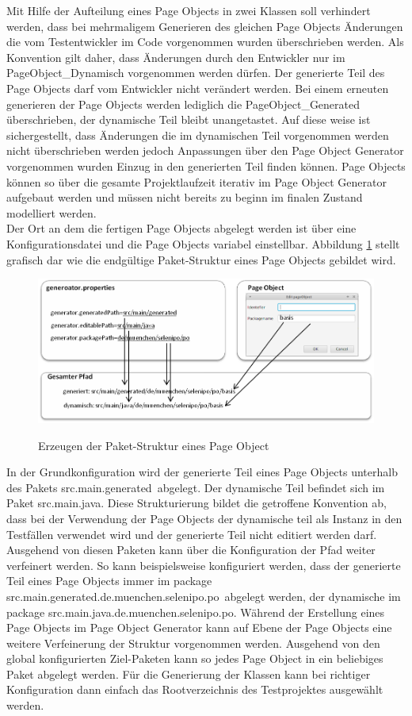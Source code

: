 Mit Hilfe der Aufteilung eines Page Objects in zwei Klassen soll verhindert werden, dass bei mehrmaligem Generieren des gleichen Page Objects Änderungen die vom Testentwickler im Code vorgenommen wurden überschrieben werden. Als Konvention gilt daher, dass Änderungen durch den Entwickler nur im PageObject\_Dynamisch vorgenommen werden dürfen. Der generierte Teil des Page Objects darf vom Entwickler nicht verändert werden.
Bei einem erneuten generieren der Page Objects werden lediglich die PageObject\_Generated überschrieben, der dynamische Teil bleibt unangetastet.
Auf diese weise ist sichergestellt, dass Änderungen die im dynamischen Teil vorgenommen werden nicht überschrieben werden jedoch Anpassungen über den Page Object Generator vorgenommen wurden Einzug in den generierten Teil finden können.
Page Objects können so über die gesamte Projektlaufzeit iterativ im Page Object Generator aufgebaut werden und müssen nicht bereits zu beginn im finalen Zustand modelliert werden.\\
Der Ort an dem die fertigen Page Objects abgelegt werden ist über eine Konfigurationsdatei und die Page Objects variabel einstellbar. 
Abbildung \ref{fig:packagepath} stellt grafisch dar wie die endgültige Paket-Struktur eines Page Objects gebildet wird.
\begin{figure}[htb]
  \centering  
  \includegraphics[scale=0.8]{img/packagePath.png}\\
  \caption{Erzeugen der Paket-Struktur eines Page Object}
  \label{fig:packagepath}
\end{figure}
In der Grundkonfiguration wird der generierte Teil eines Page Objects unterhalb des Pakets \grq src.main.generated\grq\ abgelegt. Der dynamische Teil befindet sich im Paket \grq src.main.java\grq.
Diese Strukturierung bildet die getroffene Konvention ab, dass bei der Verwendung der Page Objects der dynamische teil als Instanz in den Testfällen verwendet wird und der generierte Teil nicht editiert werden darf.
Ausgehend von diesen Paketen kann über die Konfiguration der Pfad weiter verfeinert werden. So kann beispielsweise konfiguriert werden, dass der generierte Teil eines Page Objects immer im package \grq src.main.generated.de.muenchen.selenipo.po\grq\ abgelegt werden, der dynamische im package \grq src.main.java.de.muenchen.selenipo.po\grq.
Während der Erstellung eines Page Objects im Page Object Generator kann auf Ebene der Page Objects eine weitere Verfeinerung der Struktur vorgenommen werden. Ausgehend von den global konfigurierten Ziel-Paketen kann so jedes Page Object in ein beliebiges Paket abgelegt werden.
Für die Generierung der Klassen kann bei richtiger Konfiguration dann einfach das Rootverzeichnis des Testprojektes ausgewählt werden.

